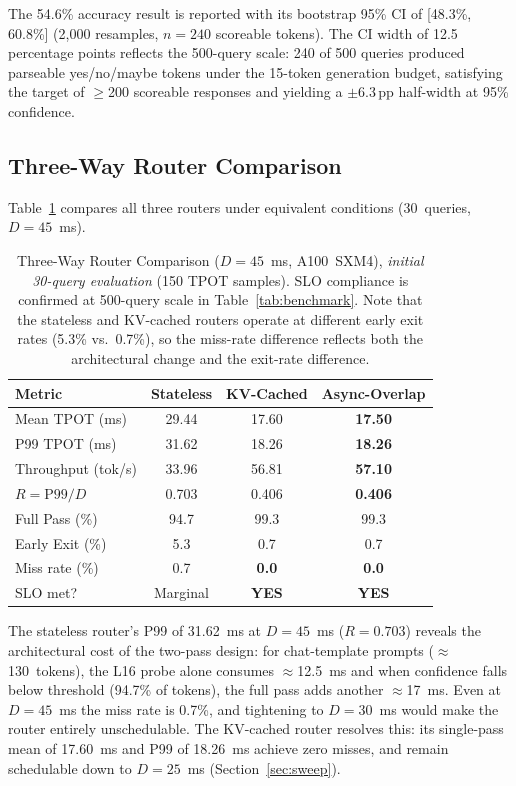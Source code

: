 \documentclass[conference]{IEEEtran}
\begin{document}
The 54.6\% accuracy result is reported with its bootstrap 95\% CI of
[48.3\%, 60.8\%] (2{,}000 resamples, $n=240$ scoreable tokens).
The CI width of 12.5 percentage points reflects the 500-query scale:
240 of 500 queries produced parseable yes/no/maybe tokens under the
15-token generation budget, satisfying the target of $\geq$200 scoreable
responses and yielding a $\pm$6.3\,pp half-width at 95\% confidence.

\subsection{Three-Way Router Comparison}
\label{sec:comparison}

Table~\ref{tab:comparison} compares all three routers under equivalent
conditions (30~queries, $D=45$~ms).

\begin{table}[htbp]
\caption{Three-Way Router Comparison ($D=45$~ms, A100~SXM4),
         \textit{initial 30-query evaluation} (150 TPOT samples).
         SLO compliance is confirmed at 500-query scale in
         Table~\ref{tab:benchmark}.
         Note that the stateless and KV-cached routers operate at
         different early exit rates (5.3\% vs.\ 0.7\%), so the
         miss-rate difference reflects both the architectural change
         and the exit-rate difference.}
\centering
\setlength{\tabcolsep}{3pt}
\begin{tabular}{@{}lccc@{}}
\toprule
\textbf{Metric} & \textbf{Stateless} & \textbf{KV-Cached} & \textbf{Async-Overlap} \\
\midrule
Mean TPOT (ms)     & 29.44 & 17.60 & \textbf{17.50} \\
P99 TPOT (ms)      & 31.62 & 18.26 & \textbf{18.26} \\
Throughput (tok/s) & 33.96 & 56.81 & \textbf{57.10} \\
$R = \text{P99}/D$ & 0.703 & 0.406 & \textbf{0.406} \\
Full Pass (\%)     & 94.7  & 99.3  & 99.3 \\
Early Exit (\%)    & 5.3   & 0.7   & 0.7 \\
Miss rate (\%)     & 0.7   & \textbf{0.0} & \textbf{0.0} \\
SLO met?           & Marginal & \textbf{YES} & \textbf{YES} \\
\bottomrule
\end{tabular}
\label{tab:comparison}
\end{table}

The stateless router's P99 of 31.62~ms at $D=45$~ms ($R=0.703$) reveals
the architectural cost of the two-pass design: for chat-template prompts
($\approx$130~tokens), the L16 probe alone consumes $\approx$12.5~ms and
when confidence falls below threshold (94.7\% of tokens), the full pass
adds another $\approx$17~ms.
Even at $D=45$~ms the miss rate is 0.7\%, and tightening to $D=30$~ms
would make the router entirely unschedulable.
The KV-cached router resolves this: its single-pass mean of 17.60~ms
and P99 of 18.26~ms achieve zero misses, and remain schedulable down to
$D=25$~ms (Section~\ref{sec:sweep}).
\end{document}
